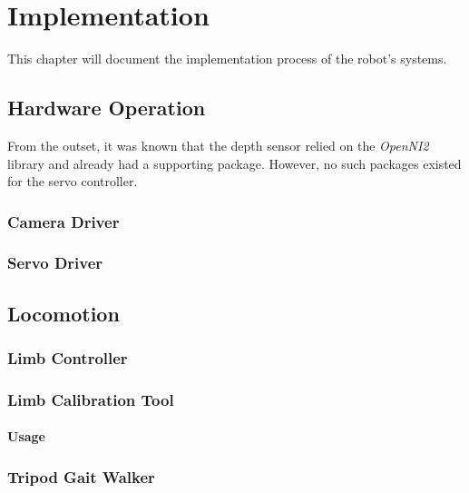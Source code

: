 \chapter{Implementation}


This chapter will document the implementation process of the robot's systems.


\section{Hardware Operation}

From the outset, it was known that the depth sensor relied on the \emph{OpenNI2} library and already had a supporting package. However, no such packages existed for the servo controller.

\subsection{Camera Driver}
\subsection{Servo Driver}


\section{Locomotion}

\subsection{Limb Controller}
\subsection{Limb Calibration Tool}
\subsubsection{Usage}

\subsection{Tripod Gait Walker}
